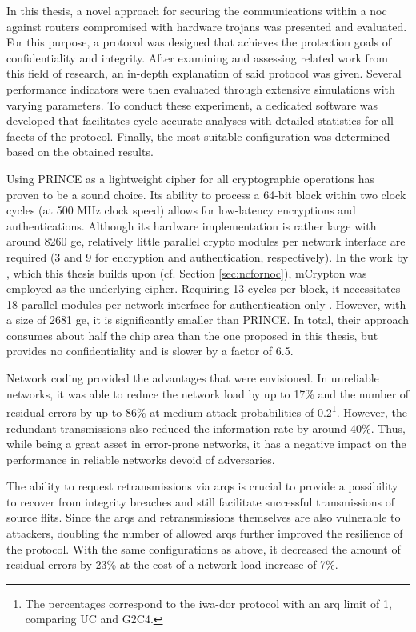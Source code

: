 In this thesis, a novel approach for securing the communications within a \gls{noc} against routers compromised with hardware trojans was presented
and evaluated. For this purpose, a protocol was designed that achieves the protection goals of confidentiality and integrity. After examining
and assessing related work from this field of research, an in-depth explanation of said protocol was given. Several performance indicators were then
evaluated through extensive simulations with varying parameters. To conduct these experiment, a dedicated software was developed that facilitates
cycle-accurate analyses with detailed statistics for all facets of the protocol. Finally, the most suitable configuration was determined based on the
obtained results.

Using PRINCE as a lightweight cipher for all cryptographic operations has proven to be a sound choice. Its ability to process a 64-bit block within two
clock cycles (at 500 MHz clock speed) allows for low-latency encryptions and authentications. Although its hardware implementation is
rather large with around 8260 \gls{ge}, relatively little parallel crypto modules per network interface are required (3 and 9 for encryption and
authentication, respectively). In the work by \citeauthor{moriam18activeattackers}, which this thesis builds upon (cf. Section \ref{sec:ncfornoc}),
mCrypton \cite{lim06mcrypton} was employed as the underlying cipher. Requiring 13 cycles per block, it necessitates 18 parallel modules per network
interface for authentication only \cite[5]{moriam18activeattackers}. However, with a size of 2681 \gls{ge}, it is significantly smaller than PRINCE.
In total, their approach consumes about half the chip area than the one proposed in this thesis, but provides no confidentiality and is slower by a
factor of 6.5.

Network coding provided the advantages that were envisioned. In unreliable networks, it was able to reduce the network load by up to 17\% and the
number of residual errors by up to 86\% at medium attack probabilities of 0.2\footnote{The percentages correspond to the \gls{iwa}-\gls{dor} protocol
with an \gls{arq} limit of 1, comparing UC and G2C4.}. However, the redundant transmissions also reduced the information rate by around 40\%. Thus,
while being a great asset in error-prone networks, it has a negative impact on the performance in reliable networks devoid of adversaries.

The ability to request retransmissions via \glspl{arq} is crucial to provide a possibility to recover from integrity breaches and still facilitate
successful transmissions of source flits. Since the \glspl{arq} and retransmissions themselves are also vulnerable to attackers, doubling
the number of allowed \glspl{arq} further improved the resilience of the protocol. With the same configurations as above, it decreased the amount of
residual errors by 23\% at the cost of a network load increase of 7\%.

